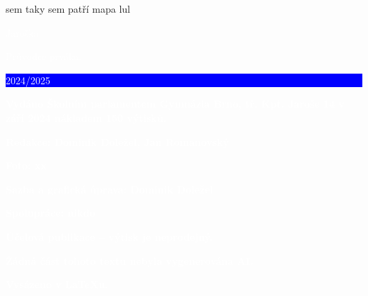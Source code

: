 \documentclass{article}
\begin{document}
\pagebreak
sem taky
\pagebreak
sem patří mapa lul
\pagebreak

\pagestyle{empty}
\pagecolor{red}
    \noindent\hspace{-3pt}\textcolor{white}{\fontsize{20}{20} \Kapitan Jaroška}

    \vspace*{\fill}


      \noindent\hspace{-3pt}\textcolor{white}{\fontsize{25}{25} \Kapitan Průvodce prváka. \colorbox{blue}{\rule[5pt]{0pt}{15pt}\large 2024/2025}}

      \vspace{1em}

      \noindent\textcolor{white}{\textbf{Vydáno Školním parlamentem Gymnázia Brno, tř. Kpt. Jaroše 14 v září 2024 nákladem 150 výtisků.}}

      \vspace{1em}

      \noindent \textcolor{white}{\textbf{Redakce: Dominik Doležel, Jan Romanovský}}

      \vspace{1em}

      \noindent \textcolor{white}{\textbf{Foto: xx}}

      \vspace{1em}

      \noindent \textcolor{white}{\textbf{Sazba a grafická úprava: Dominik Doležel}}

      \vspace{1em}

      \noindent \textcolor{white}{\textbf{Spolupráce: nikdo}}

      \vspace{1em}

      \noindent \textcolor{white}{\textbf{Účelová publikace -- výtisk je neprodejný.}}

      \vspace{1em}

      \noindent \textcolor{white}{\textbf{Žádná část tohoto textu nebyla vygenerována AI.}}

      \vspace{1em}

      \noindent \textcolor{white}{\textbf{Vysázeno v \LaTeX u.}}
\end{document}
